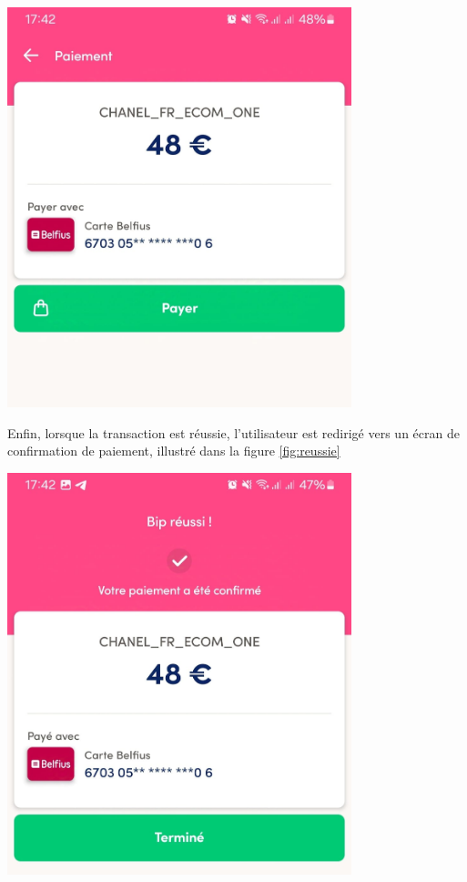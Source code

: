 \begin{center}
    \centering
    \includegraphics[width=10cm]{Figures/Screens/montant.jpeg}
    \label{fig:autorisation}
\end{center}
Enfin, lorsque la transaction est réussie, l'utilisateur est redirigé vers un écran de confirmation de paiement, illustré dans la figure \ref{fig:reussie}
\begin{center}
    \centering
    \includegraphics[width=10cm]{Figures/Screens/reussi.jpeg}
    \label{fig:reussie}
\end{center}

